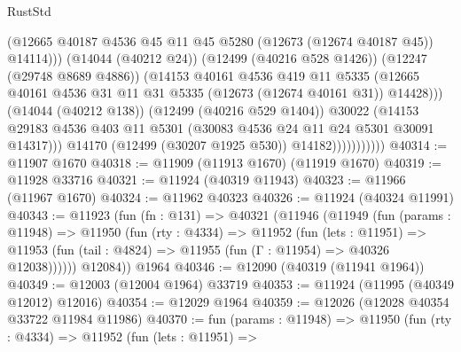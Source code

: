 \begin{lexlean}{RustStd}
\begin{coremodule}
{\begin{coremodule}
{{{{{{{{{{{{{{{{{{{{{{{{{{{{{{{{{{{{{{{{{{{{{{{{{{{{{{{{{{{{{{{{{{{{{{{{{{{{{{{{                                  (@12665
                                    @40187
                                    @4536
                                    @45
                                    @11
                                    @45
                                    @5280
                                    (@12673 (@12674 @40187 @45))
                                    @14114)))
                              (@14044 (@40212 @24))
                              (@12499 (@40216 @528 @1426))
                              (@12247 (@29748 @8689 @4886))
                              (@14153
                                @40161
                                @4536
                                @419
                                @11
                                @5335
                                (@12665
                                  @40161
                                  @4536
                                  @31
                                  @11
                                  @31
                                  @5335
                                  (@12673 (@12674 @40161 @31))
                                  @14428)))
                            (@14044 (@40212 @138))
                            (@12499 (@40216 @529 @1404))
                            @30022
                            (@14153
                              @29183
                              @4536
                              @403
                              @11
                              @5301
                              (@30083 @4536 @24 @11 @24 @5301 @30091 @14317)))
                          @14170
                          (@12499 (@30207 @1925 @530))
                          @14182)))))))))))
@40314 := @11907 @1670
@40318 := @11909 (@11913 @1670) (@11919 @1670)
@40319 := @11928 @33716
@40321 := @11924 (@40319 @11943)
@40323 := @11966 (@11967 @1670)
@40324 := @11962 @40323
@40326 := @11924 (@40324 @11991)
@40343 := @11923
    (fun (fn : @131) =>
    @40321
      (@11946
        (@11949
          (fun (params : @11948) =>
          @11950
            (fun (rty : @4334) =>
            @11952
              (fun (lets : @11951) =>
              @11953 (fun (tail : @4824) => @11955 (fun (Γ : @11954) => @40326 @12038))))))
        @12084))
    @1964
@40346 := @12090 (@40319 (@11941 @1964))
@40349 := @12003 (@12004 @1964) @33719
@40353 := @11924 (@11995 (@40349 @12012) @12016)
@40354 := @12029 @1964
@40359 := @12026 (@12028 @40354 @33722 @11984 @11986)
@40370 := fun (params : @11948) =>
  @11950
    (fun (rty : @4334) =>
    @11952
      (fun (lets : @11951) =>
}}}}}}}}}}}}}}}}}}}}}}}}}}}}}}}}}}}}}}}}}}}}}}}}}}}}}}}}}}}}}}}}}}}}}}}}}}}}}}}}
\end{coremodule}}
\end{coremodule}
\end{lexlean}

